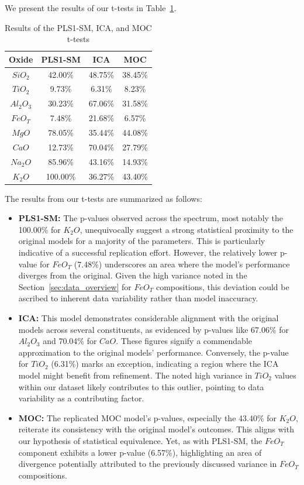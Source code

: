 We present the results of our t-tests in Table~\ref{table:results_ttests}.

\begin{table}[ht]
\centering
\begin{tabular}{|c|c|c|c|}
\hline
\textbf{Oxide} & \textbf{PLS1-SM} & \textbf{ICA} & \textbf{MOC} \\
\hline
$SiO_2$ & 42.00\% & 48.75\% & 38.45\% \\
$TiO_2$ & 9.73\% & 6.31\% & 8.23\% \\
$Al_2O_3$ & 30.23\% & 67.06\% & 31.58\% \\
$FeO_T$ & 7.48\% & 21.68\% & 6.57\% \\
$MgO$ & 78.05\% & 35.44\% & 44.08\% \\
$CaO$ & 12.73\% & 70.04\% & 27.79\% \\
$Na_2O$ & 85.96\% & 43.16\% & 14.93\% \\
$K_2O$ & 100.00\% & 36.27\% & 43.40\% \\
\hline
\end{tabular}
\caption{Results of the PLS1-SM, ICA, and MOC t-tests}
\label{table:results_ttests}
\end{table}

The results from our t-tests are summarized as follows:

\begin{itemize}
    \item \textbf{PLS1-SM:} The p-values observed across the spectrum, most notably the 100.00\% for $K_2O$, unequivocally suggest a strong statistical proximity to the original models for a majority of the parameters. This is particularly indicative of a successful replication effort. However, the relatively lower p-value for $FeO_T$ (7.48\%) underscores an area where the model's performance diverges from the original. Given the high variance noted in the Section~\ref{sec:data_overview} for $FeO_T$ compositions, this deviation could be ascribed to inherent data variability rather than model inaccuracy.
    
    \item \textbf{ICA:} This model demonstrates considerable alignment with the original models across several constituents, as evidenced by p-values like 67.06\% for $Al_2O_3$ and 70.04\% for $CaO$. These figures signify a commendable approximation to the original models’ performance. Conversely, the p-value for $TiO_2$ (6.31\%) marks an exception, indicating a region where the ICA model might benefit from refinement. The noted high variance in $TiO_2$ values within our dataset likely contributes to this outlier, pointing to data variability as a contributing factor.
    
    \item \textbf{MOC:} The replicated MOC model's p-values, especially the 43.40\% for $K_2O$, reiterate its consistency with the original model's outcomes. This aligns with our hypothesis of statistical equivalence. Yet, as with PLS1-SM, the $FeO_T$ component exhibits a lower p-value (6.57\%), highlighting an area of divergence potentially attributed to the previously discussed variance in $FeO_T$ compositions.
\end{itemize}


